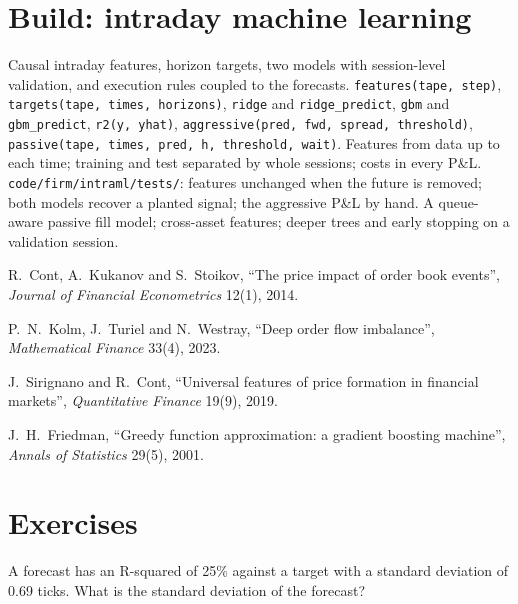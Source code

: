 \section{Build: intraday machine learning}\label{bld:s1:intraday-machine-learned-alphas:intraml}

\begin{build}
 Causal intraday features, horizon targets, two models with session-level validation, and execution rules coupled to the forecasts.
 \texttt{features(tape, step)}, \texttt{targets(tape, times, horizons)}, \texttt{ridge} and \texttt{ridge\_predict}, \texttt{gbm} and
\texttt{gbm\_predict}, \texttt{r2(y, yhat)}, \texttt{aggressive(pred, fwd, spread, threshold)}, \texttt{passive(tape, times, pred, h, threshold, wait)}.
 Features from data up to each time; training and test separated by whole sessions; costs in every P\&L.
 \texttt{code/firm/intraml/tests/}: features unchanged when the future is removed; both models recover a planted signal; the aggressive
P\&L by hand.
 A queue-aware passive fill model; cross-asset features; deeper trees and early stopping on a validation session.
\end{build}

\begin{omsources}
\item R.~Cont, A.~Kukanov and S.~Stoikov, ``The price impact of order book events'', \emph{Journal of Financial Econometrics} 12(1), 2014.
\item P.~N.~Kolm, J.~Turiel and N.~Westray, ``Deep order flow imbalance'', \emph{Mathematical Finance} 33(4), 2023.
\item J.~Sirignano and R.~Cont, ``Universal features of price formation in financial markets'', \emph{Quantitative Finance} 19(9), 2019.
\item J.~H.~Friedman, ``Greedy function approximation: a gradient boosting machine'', \emph{Annals of Statistics} 29(5), 2001.
\end{omsources}

\section{Exercises}

\begin{exercise}[$\star$]\label{exo:s1:intraday-machine-learned-alphas:1}
A forecast has an R-squared of 25\% against a target with a standard deviation of 0.69 ticks. What is the standard deviation of the forecast?
\end{exercise}

